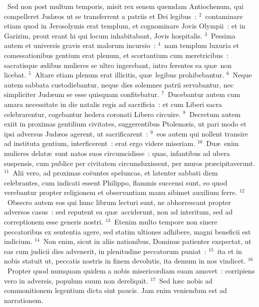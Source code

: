 ~Sed non post multum temporis, misit rex senem quemdam Antiochenum, qui compelleret Jud\ae os ut se transferrent a patriis et Dei legibus~:
${}^{2}$~contaminare etiam quod in Jerosolymis erat templum, et cognominare Jovis Olympii~: et in Garizim, prout erant hi qui locum inhabitabant, Jovis hospitalis.
${}^{3}$~Pessima autem et universis gravis erat malorum incursio~:
${}^{4}$~nam templum luxuria et comessationibus gentium erat plenum, et scortantium cum meretricibus~: sacratisque \ae dibus mulieres se ultro ingerebant, intro ferentes ea qu\ae\ non licebat.
${}^{5}$~Altare etiam plenum erat illicitis, qu\ae\ legibus prohibebantur.
${}^{6}$~Neque autem sabbata custodiebantur, neque dies solemnes patrii servabantur, nec simpliciter Jud\ae um se esse quisquam confitebatur.
${}^{7}$~Ducebantur autem cum amara necessitate in die natalis regis ad sacrificia~: et cum Liberi sacra celebrarentur, cogebantur hedera coronati Libero circuire.
${}^{8}$~Decretum autem exiit in proximas gentilium civitates, suggerentibus Ptolem\ae is, ut pari modo et ipsi adversus Jud\ae os agerent, ut sacrificarent~:
${}^{9}$~eos autem qui nollent transire ad instituta gentium, interficerent~: erat ergo videre miseriam.
${}^{10}$~Du\ae\ enim mulieres delat\ae\ sunt natos suos circumcidisse~: quas, infantibus ad ubera suspensis, cum publice per civitatem circumduxissent, per muros pr\ae cipitaverunt.
${}^{11}$~Alii vero, ad proximas co\"euntes speluncas, et latenter sabbati diem celebrantes, cum indicati essent Philippo, flammis succensi sunt, eo quod verebantur propter religionem et observantiam manu sibimet auxilium ferre.
${}^{12}$~Obsecro autem eos qui hunc librum lecturi sunt, ne abhorrescant propter adversos casus~: sed reputent ea qu\ae\ acciderunt, non ad interitum, sed ad correptionem esse generis nostri.
${}^{13}$~Etenim multo tempore non sinere peccatoribus ex sententia agere, sed statim ultiones adhibere, magni beneficii est indicium.
${}^{14}$~Non enim, sicut in aliis nationibus, Dominus patienter exspectat, ut eas cum judicii dies advenerit, in plenitudine peccatorum puniat~:
${}^{15}$~ita et in nobis statuit ut, peccatis nostris in finem devolutis, ita demum in nos vindicet.
${}^{16}$~Propter quod numquam quidem a nobis misericordiam suam amovet~: corripiens vero in adversis, populum suum non dereliquit.
${}^{17}$~Sed h\ae c nobis ad commonitionem legentium dicta sint paucis. Jam enim veniendum est ad narrationem.


